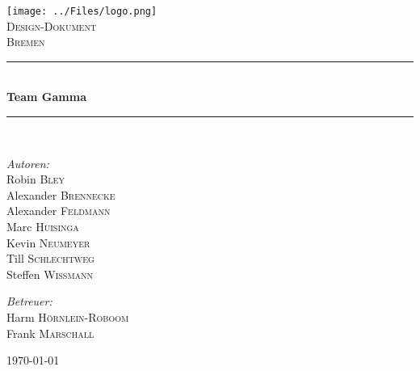 \documentclass{article}
\begin{document}
\begin{titlepage}

\begin{center}
\texttt{[image: ../Files/logo.png]}\\[1cm]    

\textsc{\LARGE Design-Dokument}\\[1.5cm]

\textsc{\Large Bremen}\\[0.5cm]


\newcommand{\HRule}{\rule{\linewidth}{0.5mm}}
\HRule \\[0.4cm]
{ \huge \bfseries Team Gamma}\\[0.4cm]

\HRule \\[1.5cm]

\begin{minipage}{0.4\textwidth}
\begin{flushleft} \large
\emph{Autoren:}\\
Robin \textsc{Bley}\\
Alexander \textsc{Brennecke}\\
Alexander \textsc{Feldmann}\\
Marc \textsc{Huisinga}\\
Kevin \textsc{Neumeyer}\\
Till \textsc{Schlechtweg}\\
Steffen \textsc{Wißmann}
\end{flushleft}
\end{minipage}
\hfill
\begin{minipage}{0.4\textwidth}
\begin{flushright} \large
\emph{Betreuer:} \\
Harm \textsc{Hörnlein-Roboom}\\
Frank \textsc{Marschall}
\end{flushright}
\end{minipage}

\vfill

{\large \today}

\end{center}

\end{titlepage}

\newpage
\thispagestyle{empty}
\tableofcontents
\thispagestyle{empty}
\newpage
\setcounter{page}{1}


\end{document}
